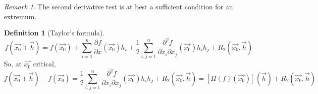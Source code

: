 \documentclass[12pt]{book}
\theoremstyle{definition}
\newtheorem{definition}{Definition}[section]
\theoremstyle{remark}
\newtheorem*{remark}{Remark}
\begin{document}
  \begin{remark}
    The second derivative test is at best a sufficient condition for an extremum.
  \end{remark}
  \begin{definition}[Taylor's formula] 
    $$f(\vec{{x_0}} + \vec{{h}}) = f(\vec{{x_0}}) + \sum^{n}_{i=1} \frac{\partial {f}}{\partial {x}} {(\vec{{x_0}})} h_i  + \frac{1}{2} \sum^{n}_{i,j = 1} \frac{\partial^2 {f}}{\partial {x_i} \partial {x_j}} {(\vec{{x_0}}) h_i h_j} + R_2(\vec{{x_0}} , \vec{{h}}) $$ 
    So, at $\vec{{x_0}}$ critical, 
    $$ f(\vec{{x_0}} + \vec{{h}}) - f(\vec{{x_0}}) = \frac{1}{2} \sum^{n}_{i,j = 1} \frac{\partial^2 {f}}{\partial {x_i} \partial {x_j}} (\vec{{x_0}}) h_ih_j + R_2(\vec{{x_0}} , \vec{{h}}) = [H(f)(\vec{{x_0}})](\vec{{h}})+ R_2(\vec{{x_0}} , \vec{{h}}) $$
  \end{definition}
\end{document}

